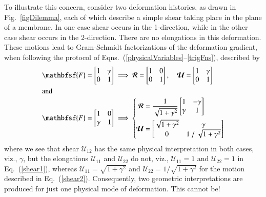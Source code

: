 To illustrate this concern, consider two deformation histories, as drawn in Fig.~\ref{figDilemma}, each of which describe a simple shear taking place in the plane of a membrane.  In one case shear occurs in the 1-direction, while in the other case shear occurs in the 2-direction.  There are no elongations in this deformation.  These motions lead to Gram-Schmidt factorizations of the deformation gradient, when following the protocol of Eqns.~(\ref{physicalVariables}--\ref{trigFns}), described by
\begin{subequations}
	\label{shears}
	\begin{align}
	\mathbfsf{F} = 
	\begin{bmatrix} 1 & \gamma \\ 0 & 1 \end{bmatrix} & \implies 
	\boldsymbol{\mathcal{R}} = 
	\begin{bmatrix} 1 & 0 \\ 0 & 1 \end{bmatrix} , \quad
	\boldsymbol{\mathcal{U}} = 
	\begin{bmatrix} 1 & \gamma \\ 0 & 1  \end{bmatrix} 
	\label{shear1} \\
	\intertext{and}
	\mathbfsf{F} = 
	\begin{bmatrix} 1 & 0 \\ \gamma & 1 \end{bmatrix} & \implies \left\{
	\begin{aligned} \mbox{}
	\boldsymbol{\mathcal{R}} & = \frac{1}{\sqrt{1 + \gamma^2}}
	\begin{bmatrix} 1 & -\gamma \\ \gamma & 1 \end{bmatrix} \\
	\boldsymbol{\mathcal{U}} & = 
	\begin{bmatrix} \sqrt{1 + \gamma^2} & \gamma \\ 
	0 & 1 \bigm/ \sqrt{1 + \gamma^2} \end{bmatrix}
	\end{aligned} \right.
	\label{shear2}
	\end{align}
\end{subequations}
where we see that shear $\mathcal{U}_{12}$ has the same physical interpretation in both cases, viz., $\gamma$, but the elongations $\mathcal{U}_{11}$ and $\mathcal{U}_{22}$ do not, viz., $\mathcal{U}_{11}=1$ and $\mathcal{U}_{22}=1$ in Eq.~(\ref{shear1}), whereas $\mathcal{U}_{11} = \sqrt{1 + \gamma^2}$ and $\mathcal{U}_{22} = 1 / \sqrt{1 + \gamma^2}$ for the motion described in Eq.~(\ref{shear2}).  Consequently, two geometric interpretations are produced for just one physical mode of deformation.  This cannot be!

